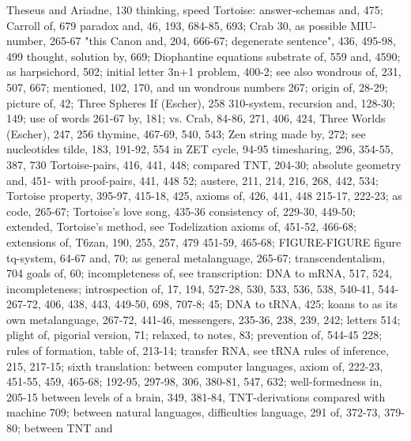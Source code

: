 Theseus and Ariadne, 130 thinking, speed         Tortoise: answer-schemas and, 475; Carroll
of, 679                                          paradox and, 46, 193, 684-85, 693; Crab
30, as possible MIU-number, 265-67 "this         Canon and, 204, 666-67; degenerate
sentence", 436, 495-98, 499 thought,             solution by, 669; Diophantine equations
substrate of, 559                                and, 4590; as harpsichord, 502; initial letter
3n+1 problem, 400-2; see also wondrous           of, 231, 507, 667; mentioned, 102, 170,
and un wondrous numbers                          267; origin of, 28-29; picture of, 42;
Three Spheres If (Escher), 258 310-system,       recursion and, 128-30; 149; use of words
261-67                                           by, 181; vs. Crab, 84-86, 271, 406, 424,
Three Worlds (Escher), 247, 256 thymine,         467-69, 540, 543; Zen string made by, 272;
see nucleotides tilde, 183, 191-92, 554          in ZET cycle, 94-95
timesharing, 296, 354-55, 387, 730               Tortoise-pairs, 416, 441, 448; compared
TNT, 204-30; absolute geometry and, 451-         with proof-pairs, 441, 448
52; austere, 211, 214, 216, 268, 442, 534;       Tortoise property, 395-97, 415-18, 425,
axioms of,                                       426, 441, 448
215-17, 222-23; as code, 265-67;                 Tortoise's love song, 435-36
consistency of, 229-30, 449-50; extended,        Tortoise's method, see Todelization
axioms of, 451-52, 466-68; extensions of,        T6zan, 190, 255, 257, 479
451-59, 465-68; FIGURE-FIGURE figure             tq-system, 64-67
and, 70; as general metalanguage, 265-67;        transcendentalism, 704
goals of, 60; incompleteness of, see             transcription: DNA to mRNA, 517, 524,
incompleteness; introspection of, 17, 194,       527-28, 530, 533, 536, 538, 540-41, 544-
267-72, 406, 438, 443, 449-50, 698, 707-8;       45; DNA to tRNA, 425; koans to
as its own metalanguage, 267-72, 441-46,         messengers, 235-36, 238, 239, 242; letters
514; plight of, pigorial version, 71; relaxed,   to notes, 83; prevention of, 544-45
228; rules of formation, table of, 213-14;       transfer RNA, see tRNA
rules of inference, 215, 217-15; sixth           translation: between computer languages,
axiom of, 222-23, 451-55, 459, 465-68;           192-95, 297-98, 306, 380-81, 547, 632;
well-formedness in, 205-15                       between levels of a brain, 349, 381-84,
TNT-derivations compared with machine            709; between natural languages, difficulties
language, 291                                    of, 372-73, 379-80; between TNT and
